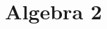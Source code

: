 \documentclass[11pt, a4paper]{article}
\theoremstyle{plain}{
    \newtheorem{izrek}{Izrek}[section]
    \newtheorem{trditev}[izrek]{Trditev}
    \newtheorem{posledica}{Posledica}[izrek]
    \newtheorem{lema}[izrek]{Lema}
    \newtheorem{aksiom}[izrek]{Aksiom}
}
\theoremstyle{definition}{
    \newtheorem{definicija}{Definicija}[section]
}
\theoremstyle{remark}{
    \newtheorem*{opomba}{Opomba}
    \newtheorem*{primer}{Primer}   
    \newtheorem*{zgled}{Zgled}   
}
\begin{document}
\title{Algebra 2}
\maketitle


\end{document}
